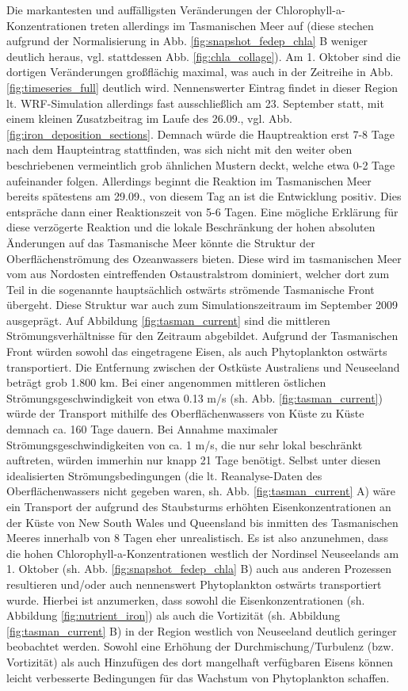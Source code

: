 \documentclass[12pt,a4paper,onecolumn]{scrartcl}
\begin{document}
Die markantesten und auffälligsten Veränderungen der Chlorophyll-a-Konzentrationen treten allerdings im Tasmanischen Meer auf (diese stechen aufgrund der Normalisierung in Abb. \ref{fig:snapshot_fedep_chla} B weniger deutlich heraus, vgl. stattdessen Abb. \ref{fig:chla_collage}). Am 1. Oktober sind die dortigen Veränderungen großflächig maximal, was auch in der Zeitreihe in Abb. \ref{fig:timeseries_full} deutlich wird. Nennenswerter Eintrag findet in dieser Region lt. WRF-Simulation allerdings fast ausschließlich am 23. September statt, mit einem kleinen Zusatzbeitrag im Laufe des 26.09., vgl. Abb. \ref{fig:iron_deposition_sections}. Demnach würde die Hauptreaktion erst 7-8 Tage nach dem Haupteintrag stattfinden, was sich nicht mit den weiter oben beschriebenen vermeintlich grob ähnlichen Mustern deckt, welche etwa 0-2 Tage aufeinander folgen. Allerdings beginnt die Reaktion im Tasmanischen Meer bereits spätestens am 29.09., von diesem Tag an ist die Entwicklung positiv. Dies entspräche dann einer Reaktionszeit von 5-6 Tagen. Eine mögliche Erklärung für diese verzögerte Reaktion und die lokale Beschränkung der hohen absoluten Änderungen auf das Tasmanische Meer könnte die Struktur der Oberflächenströmung des Ozeanwassers bieten. Diese wird im tasmanischen Meer vom aus Nordosten eintreffenden Ostaustralstrom dominiert, welcher dort zum Teil in die sogenannte hauptsächlich ostwärts strömende Tasmanische Front übergeht. Diese Struktur war auch zum Simulationszeitraum im September 2009 ausgeprägt. Auf Abbildung \ref{fig:tasman_current} sind die mittleren Strömungsverhältnisse für den Zeitraum abgebildet. Aufgrund der Tasmanischen Front würden sowohl das eingetragene Eisen, als auch Phytoplankton ostwärts transportiert. Die Entfernung zwischen der Ostküste Australiens und Neuseeland beträgt grob 1.800 km. Bei einer angenommen mittleren östlichen Strömungsgeschwindigkeit von etwa 0.13 m/s (sh. Abb. \ref{fig:tasman_current}) würde der Transport mithilfe des Oberflächenwassers von Küste zu Küste demnach ca. 160 Tage dauern. Bei Annahme maximaler Strömungsgeschwindigkeiten von ca. 1 m/s, die nur sehr lokal beschränkt auftreten, würden immerhin nur knapp 21 Tage benötigt. Selbst unter diesen idealisierten Strömungsbedingungen (die lt. Reanalyse-Daten des Oberflächenwassers nicht gegeben waren, sh. Abb. \ref{fig:tasman_current} A) wäre ein Transport der aufgrund des Staubsturms erhöhten Eisenkonzentrationen an der Küste von New South Wales und Queensland bis inmitten des Tasmanischen Meeres innerhalb von 8 Tagen eher unrealistisch. Es ist also anzunehmen, dass die hohen Chlorophyll-a-Konzentrationen westlich der Nordinsel Neuseelands am 1. Oktober (sh. Abb. \ref{fig:snapshot_fedep_chla} B) auch aus anderen Prozessen resultieren und/oder auch nennenswert Phytoplankton ostwärts transportiert wurde. Hierbei ist anzumerken, dass sowohl die Eisenkonzentrationen (sh. Abbildung \ref{fig:nutrient_iron}) als auch die Vortizität (sh. Abbildung \ref{fig:tasman_current} B) in der Region westlich von Neuseeland deutlich geringer beobachtet werden. Sowohl eine Erhöhung der Durchmischung/Turbulenz (bzw. Vortizität) als auch Hinzufügen des dort mangelhaft verfügbaren Eisens können leicht verbesserte Bedingungen für das Wachstum von Phytoplankton schaffen. \\
\end{document}
